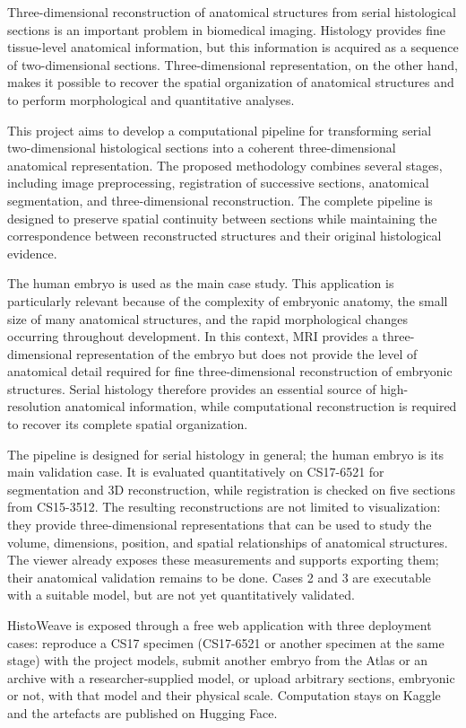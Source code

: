 \documentclass[12pt,a4paper]{report}
\begin{document}
Three-dimensional reconstruction of anatomical structures from serial histological sections is an important problem in biomedical imaging. Histology provides fine tissue-level anatomical information, but this information is acquired as a sequence of two-dimensional sections. Three-dimensional representation, on the other hand, makes it possible to recover the spatial organization of anatomical structures and to perform morphological and quantitative analyses.

This project aims to develop a computational pipeline for transforming serial two-dimensional histological sections into a coherent three-dimensional anatomical representation. The proposed methodology combines several stages, including image preprocessing, registration of successive sections, anatomical segmentation, and three-dimensional reconstruction. The complete pipeline is designed to preserve spatial continuity between sections while maintaining the correspondence between reconstructed structures and their original histological evidence.

The human embryo is used as the main case study. This application is particularly relevant because of the complexity of embryonic anatomy, the small size of many anatomical structures, and the rapid morphological changes occurring throughout development. In this context, MRI provides a three-dimensional representation of the embryo but does not provide the level of anatomical detail required for fine three-dimensional reconstruction of embryonic structures. Serial histology therefore provides an essential source of high-resolution anatomical information, while computational reconstruction is required to recover its complete spatial organization.

The pipeline is designed for serial histology in general; the human embryo is its main validation case. It is evaluated quantitatively on CS17-6521 for segmentation and 3D reconstruction, while registration is checked on five sections from CS15-3512. The resulting reconstructions are not limited to visualization: they provide three-dimensional representations that can be used to study the volume, dimensions, position, and spatial relationships of anatomical structures. The viewer already exposes these measurements and supports exporting them; their anatomical validation remains to be done. Cases 2 and 3 are executable with a suitable model, but are not yet quantitatively validated.

HistoWeave is exposed through a free web application with three deployment cases: reproduce a CS17 specimen (CS17-6521 or another specimen at the same stage) with the project models, submit another embryo from the Atlas or an archive with a researcher-supplied model, or upload arbitrary sections, embryonic or not, with that model and their physical scale. Computation stays on Kaggle and the artefacts are published on Hugging Face.
\end{document}
